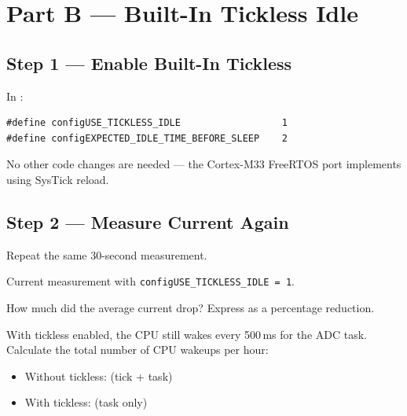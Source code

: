 \documentclass[11pt, a4paper]{article}
\begin{document}
\section{Part B --- Built-In Tickless Idle}

\subsection{Step 1 --- Enable Built-In Tickless}

In :

\begin{lstlisting}[style=cstyle]
#define configUSE_TICKLESS_IDLE                  1
#define configEXPECTED_IDLE_TIME_BEFORE_SLEEP    2
\end{lstlisting}

No other code changes are needed --- the Cortex-M33 FreeRTOS port implements
 using SysTick reload.

\subsection{Step 2 --- Measure Current Again}

Repeat the same 30-second measurement.

\begin{checkpointbox}[~B]
  Current measurement with \texttt{configUSE\_TICKLESS\_IDLE\,=\,1}.
\end{checkpointbox}

\begin{questionbox}[~B1]
  How much did the average current drop? Express as a percentage reduction.
\end{questionbox}

\begin{questionbox}[~B2]
  With tickless enabled, the CPU still wakes every 500\,ms for the ADC task.
  Calculate the total number of CPU wakeups per hour:
  \begin{itemize}[noitemsep]
    \item Without tickless: \underline{\hspace{2cm}} (tick + task)
    \item With tickless:    \underline{\hspace{2cm}} (task only)
  \end{itemize}
\end{questionbox}
\end{document}
